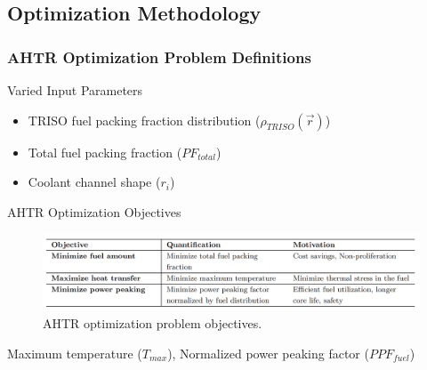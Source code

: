 \subsection{Optimization Methodology}
\begin{frame}
    \frametitle{AHTR Optimization Problem Definitions}
    \begin{block}{Varied Input Parameters}
        \begin{itemize}
            \item TRISO fuel packing fraction distribution ($\rho_{TRISO}(\vec{r})$)
            \item Total fuel packing fraction ($PF_{total}$)
            \item Coolant channel shape ($r_i$)
        \end{itemize}
    \end{block}
    \begin{block}{AHTR Optimization Objectives}
        \begin{figure}
            \includegraphics[width=0.9\linewidth]{figures/ahtr-opt-obj.png} 
            \caption{AHTR optimization problem objectives.}
        \end{figure}
    Maximum temperature ($T_{max}$), Normalized power peaking factor ($PPF_{fuel}$)
    \end{block}
\end{frame}

